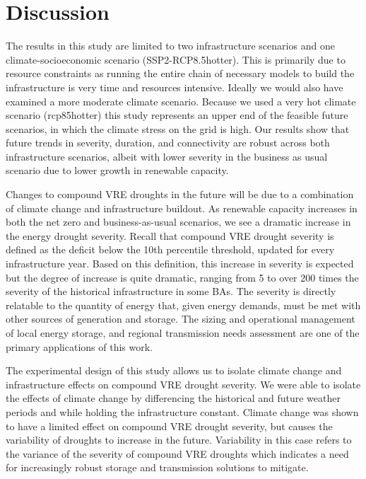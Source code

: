 \documentclass{agujournal2019}
\begin{document}
\section{Discussion}

The results in this study are limited to two infrastructure scenarios and one climate-socioeconomic scenario (SSP2-RCP8.5hotter). This is primarily due to resource constraints as running the entire chain of necessary models to build the infrastructure is very time and resources intensive. Ideally we would also have examined a more moderate climate scenario. Because we used a very hot climate scenario (rcp85hotter) this study represents an upper end of the feasible future scenarios, in which the climate stress on the grid is high. Our results show that future trends in severity, duration, and connectivity are robust across both infrastructure scenarios, albeit with lower severity in the business as usual scenario due to lower growth in renewable capacity. 

Changes to compound VRE droughts in the future will be due to a combination of climate change and infrastructure buildout. As renewable capacity increases in both the net zero and business-as-usual scenarios, we see a dramatic increase in the energy drought severity. Recall that compound VRE drought severity is defined as the deficit below the 10th percentile threshold, updated for every infrastructure year. Based on this definition, this increase in severity is expected but the degree of increase is quite dramatic, ranging from 5 to over 200 times the severity of the historical infrastructure in some BAs. The severity is directly relatable to the quantity of energy that, given energy demands, must be met with other sources of generation and storage. The sizing and operational management of local energy storage, and regional transmission needs assessment are one of the primary applications of this work.  

The experimental design of this study allows us to isolate climate change and infrastructure effects on compound VRE drought severity. We were able to isolate the effects of climate change by differencing the historical and future weather periods and while holding the infrastructure constant. Climate change was shown to have a limited effect on compound VRE drought severity, but causes the variability of droughts to increase in the future. Variability in this case refers to the variance of the severity of compound VRE droughts which indicates a need for increasingly robust storage and transmission solutions to mitigate. 
\end{document}

